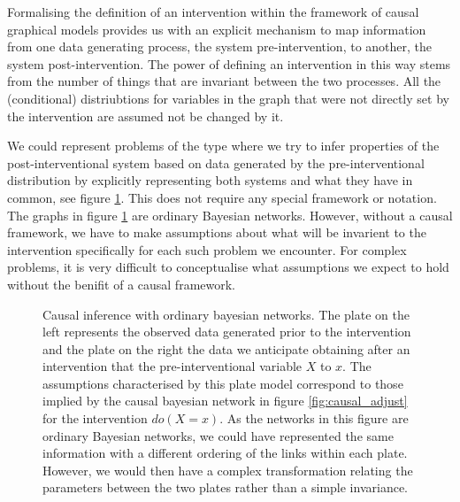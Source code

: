 \documentclass[11pt,a4paper,oneside]{book}
\theoremstyle{plain}
\theoremstyle{definition}
\begin{document}
Formalising the definition of an intervention within the framework of causal graphical models provides us with an explicit mechanism to map information from one data generating process, the system pre-intervention, to another, the system post-intervention. The power of defining an intervention in this way stems from the number of things that are invariant between the two processes. All the (conditional) distriubtions for variables in the graph that were not directly set by the intervention are assumed not be changed by it.  

We could represent problems of the type where we try to infer properties of the post-interventional system based on data generated by the pre-interventional distribution by explicitly representing both systems and what they have in common, see figure \ref{fig:causal_ordinary_bayes}. This does not require any special framework or notation. The graphs in figure  \ref{fig:causal_ordinary_bayes} are ordinary Bayesian networks. However, without a causal framework, we have to make assumptions about what will be invarient to the intervention specifically for each such problem we encounter. For complex problems, it is very difficult to conceptualise what assumptions we expect to hold without the benifit of a causal framework.  


\begin{figure}[h]
\center
\caption{Causal inference with ordinary bayesian networks. The plate on the left represents the observed data generated prior to the intervention and the plate on the right the data we anticipate obtaining after an intervention that the pre-interventional variable $X$ to $x$. The assumptions characterised by this plate model correspond to those implied by the causal bayesian network in figure \ref{fig:causal_adjust} for the intervention $do(X=x)$. As the networks in this figure are ordinary Bayesian networks, we could have represented the same information with a different ordering of the links within each plate. However, we would then have a complex transformation relating the parameters between the two plates rather than a simple invariance.}
\label{fig:causal_ordinary_bayes}
\end{figure}
\end{document}
